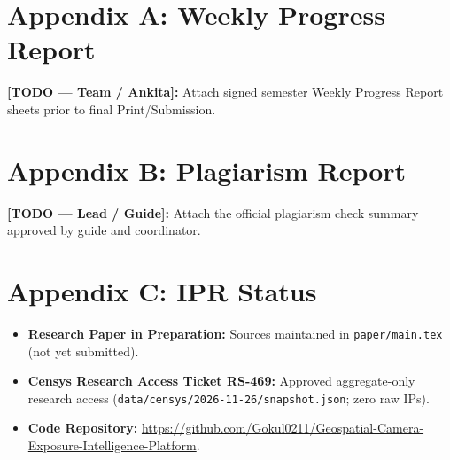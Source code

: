 \documentclass[12pt,a4paper]{article}
\begin{document}
\appendix
\section*{Appendix A: Weekly Progress Report}
\noindent\textbf{[TODO — Team / Ankita]:} Attach signed semester Weekly Progress Report sheets prior to final Print/Submission.

\section*{Appendix B: Plagiarism Report}
\noindent\textbf{[TODO — Lead / Guide]:} Attach the official plagiarism check summary approved by guide and coordinator.

\section*{Appendix C: IPR Status}
\begin{itemize}
  \item \textbf{Research Paper in Preparation:} Sources maintained in \texttt{paper/main.tex} (not yet submitted).
  \item \textbf{Censys Research Access Ticket RS-469:} Approved aggregate-only research access (\texttt{data/censys/2026-11-26/snapshot.json}; zero raw IPs).
  \item \textbf{Code Repository:} \url{https://github.com/Gokul0211/Geospatial-Camera-Exposure-Intelligence-Platform}.
\end{itemize}
\end{document}
